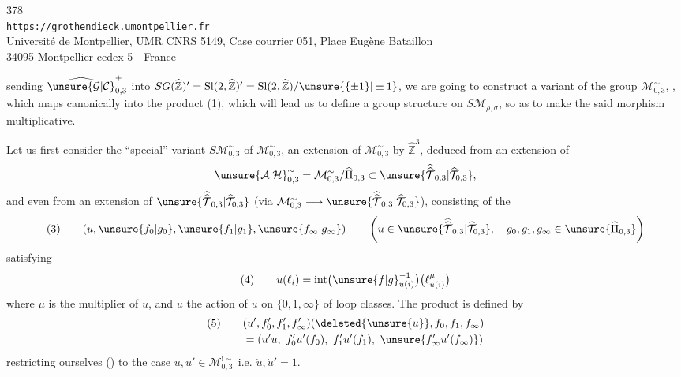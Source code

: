 \begin{center}
378\\
\texttt{https://grothendieck.umontpellier.fr}\\
Université de Montpellier, UMR CNRS 5149, Case courrier 051, Place Eugène Bataillon\\
34095 Montpellier cedex 5 - France
\end{center}


sending $\widehat{\unsure{\mathcal{G}|\mathcal{C}}}_{0,3}^{+}$ into
$SG(\widehat{\mathbb{Z}})'=\mathrm{Sl}(2,\widehat{\mathbb{Z}})'
=\mathrm{Sl}(2,\widehat{\mathbb{Z}})/\unsure{\{\pm1\}|\pm1}$,
we are going to construct a variant of the group $\mathcal{M}_{0,3}^{\sim}$,
, which maps canonically into the product (1),
which will lead us to define a group structure on
$S\mathcal{M}_{\rho,\sigma}$, so as to make the said morphism
multiplicative.

Let us first consider the ``special'' variant
$S\mathcal{M}_{0,3}^{\sim}$ of $\mathcal{M}_{0,3}^{\sim}$, an extension
of $\mathcal{M}_{0,3}^{\sim}$ by $\widehat{\mathbb{Z}}^3$,
deduced from an extension of
\[
\unsure{\mathcal{A}|\mathcal{H}}_{0,3}^{\sim}
=\mathcal{M}_{0,3}^{\sim}/\widehat{\Pi}_{0,3}
\subset\unsure{\widehat{\widehat{\mathcal{T}}}_{0,3}|\widehat{\mathcal{T}}_{0,3}},
\]
 and even from an extension of
$\unsure{\widehat{\widehat{\mathcal{T}}}_{0,3}|\widehat{\mathcal{T}}_{0,3}}$
(via $\mathcal{M}_{0,3}^{\sim}\longrightarrow
\unsure{\widehat{\widehat{\mathcal{T}}}_{0,3}|\widehat{\mathcal{T}}_{0,3}}$),
consisting of the
\[
(3)\qquad
(u,\unsure{f_0|g_0},\unsure{f_1|g_1},\unsure{f_\infty|g_\infty})
\qquad
\left(u\in\unsure{\widehat{\widehat{\mathcal{T}}}_{0,3}|\widehat{\mathcal{T}}_{0,3}},\quad
g_0,g_1,g_\infty\in\unsure{\widehat{\Pi}_{0,3}}\right)
\]
satisfying
\[
(4)\qquad
u(\ell_i)=\operatorname{int}\bigl(\unsure{f|g}_{\dot{u}(i)}^{-1}\bigr)
\bigl(\ell_{\dot{u}(i)}^{\mu}\bigr)
\]
where $\mu$ is the multiplier of $u$, and $\dot{u}$ the action of $u$
on  $\{0,1,\infty\}$ of loop classes.
The product is defined by
\[
\begin{aligned}
(5)\qquad &(u',f'_0,f'_1,f'_\infty)
(\deleted{\unsure{u}},f_0,f_1,f_\infty)\\
&=(u'u,\ f'_0u'(f_0),\ f'_1u'(f_1),\ \unsure{f'_\infty u'(f_\infty)})
\end{aligned}
\]
restricting ourselves () to the case
$u,u'\in\mathcal{M}_{0,3}^{!\sim}$ i.e. $\dot{u},\dot{u}'=1$.

